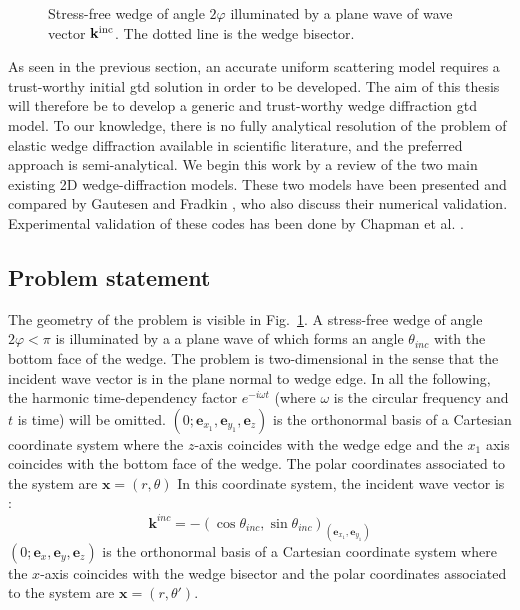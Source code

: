 \begin{figure}
\caption{Stress-free wedge of angle $2\varphi$ illuminated by a plane wave of wave vector $\mathbf{k}^{\rm inc}$. The dotted line is the wedge bisector.}
\label{C1:wedge}
\end{figure}

As seen in the previous section, an accurate uniform scattering model requires a trust-worthy initial \acrshort{gtd} solution in order to be developed. The aim of this thesis will therefore be to develop a generic and trust-worthy wedge diffraction \acrshort{gtd} model. To our knowledge, there is no fully analytical resolution of the problem of elastic wedge diffraction available in scientific literature, and the preferred approach is semi-analytical. We begin this work by a review of the two main existing 2D wedge-diffraction models. These two models have been presented and compared by Gautesen and Fradkin \cite{GautesenFradkin}, who also discuss their numerical validation. Experimental validation  of these codes has been done by Chapman et al. \cite{ChapmanLTval}.

\subsection{Problem statement}
\label{C1:PbStatement}
The geometry of the problem is visible in Fig.~\ref{C1:wedge}. A stress-free wedge of angle $2\varphi<\pi$ is illuminated by a a plane wave of which forms an angle $\theta_{inc}$ with the bottom face of the wedge. The problem is two-dimensional in the sense that the incident wave vector is in the plane normal to wedge edge. In all the following, the harmonic time-dependency factor $e^{- i\omega t}$ (where $\omega$ is the circular frequency and $t$ is time) will be omitted. $(0;\mathbf{e}_{x_1},\mathbf{e}_{y_1},\mathbf{e}_z)$ is the orthonormal basis of a Cartesian coordinate system where the $z$-axis coincides with the wedge edge and the $x_1$ axis coincides with the bottom face of the wedge. The polar coordinates associated to the system are $\mathbf{x}=(r,\theta)$ In this coordinate system, the incident wave vector is :
\begin{equation}
\mathbf{k}^{inc}=-(\cos\theta_{inc},\sin\theta_{inc})_{(\mathbf{e}_{x_1},\mathbf{e}_{y_1})}
\end{equation}
$(0;\mathbf{e}_x,\mathbf{e}_y,\mathbf{e}_z)$ is the orthonormal basis of a Cartesian coordinate system where the $x$-axis coincides with the wedge bisector and the polar coordinates associated to the system are $\mathbf{x}=(r,\theta')$.

